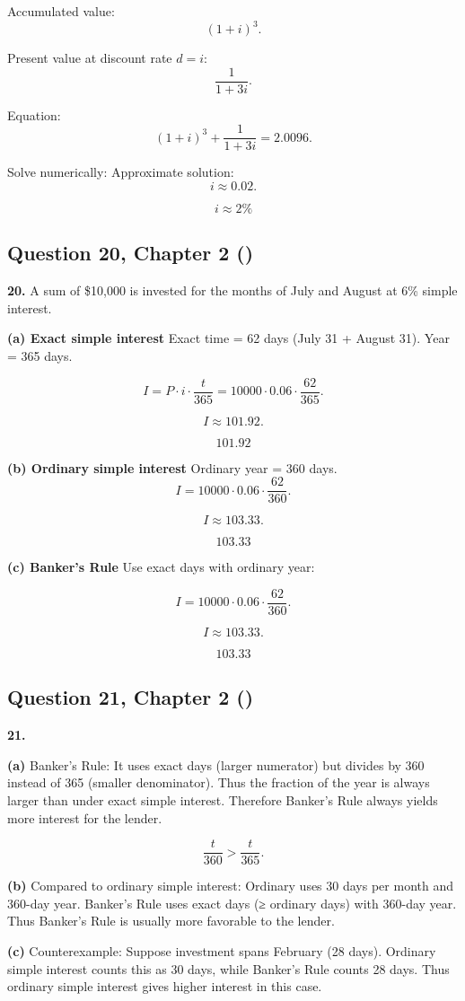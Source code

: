 \documentclass[12pt, a4paper]{article}
\begin{document}
\bigskip
Accumulated value:
\[
(1+i)^3.
\]

Present value at discount rate \(d=i\):
\[
\frac{1}{1+3i}.
\]

Equation:
\[
(1+i)^3 + \frac{1}{1+3i} = 2.0096.
\]

Solve numerically:  
Approximate solution:
\[
i \approx 0.02.
\]

\[
\boxed{i \approx 2\%}
\]

\subsection*{Question 20, Chapter 2 (\cite{toi3rd})}

\textbf{20.} A sum of \$10{,}000 is invested for the months of July and August at 6\% simple interest.  

\bigskip
\textbf{(a) Exact simple interest}  
Exact time = 62 days (July 31 + August 31).  
Year = 365 days.  

\[
I = P \cdot i \cdot \frac{t}{365}
= 10000 \cdot 0.06 \cdot \frac{62}{365}.
\]

\[
I \approx 101.92.
\]

\[
\boxed{101.92}
\]

\bigskip
\textbf{(b) Ordinary simple interest}  
Ordinary year = 360 days.  
\[
I = 10000 \cdot 0.06 \cdot \frac{62}{360}.
\]

\[
I \approx 103.33.
\]

\[
\boxed{103.33}
\]

\bigskip
\textbf{(c) Banker's Rule}  
Use exact days with ordinary year:  

\[
I = 10000 \cdot 0.06 \cdot \frac{62}{360}.
\]

\[
I \approx 103.33.
\]

\[
\boxed{103.33}
\]


\subsection*{Question 21, Chapter 2 (\cite{toi3rd})}

\textbf{21.}  

\bigskip
\textbf{(a)} Banker's Rule:  
It uses exact days (larger numerator) but divides by 360 instead of 365 (smaller denominator).  
Thus the fraction of the year is always larger than under exact simple interest.  
Therefore Banker's Rule always yields more interest for the lender.  

\[
\frac{t}{360} > \frac{t}{365}.
\]

\bigskip
\textbf{(b)} Compared to ordinary simple interest:  
Ordinary uses 30 days per month and 360-day year.  
Banker's Rule uses exact days (≥ ordinary days) with 360-day year.  
Thus Banker's Rule is usually more favorable to the lender.  

\bigskip
\textbf{(c)} Counterexample:  
Suppose investment spans February (28 days).  
Ordinary simple interest counts this as 30 days,  
while Banker's Rule counts 28 days.  
Thus ordinary simple interest gives higher interest in this case.  


\newpage
\printbibliography
\end{document}

